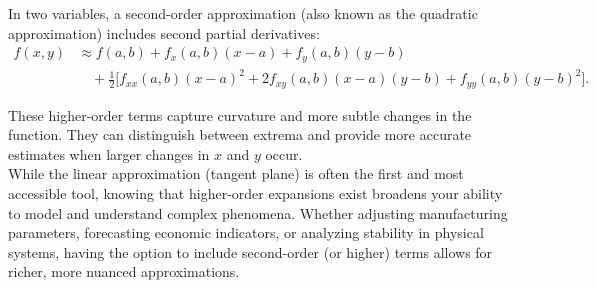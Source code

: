 \noindent In two variables, a second-order approximation (also known as the quadratic approximation) includes second partial derivatives:
\[
\begin{split}
f(x,y) &\approx f(a,b) + f_x(a,b)(x-a) + f_y(a,b)(y-b) \\
&\quad + \tfrac{1}{2}\bigl[f_{xx}(a,b)(x-a)^2 + 2f_{xy}(a,b)(x-a)(y-b) + f_{yy}(a,b)(y-b)^2\bigr].
\end{split}
\]

\noindent These higher-order terms capture curvature and more subtle changes in the function. They can distinguish between extrema and provide more accurate estimates when larger changes in \( x \) and \( y \) occur. \\

\noindent While the linear approximation (tangent plane) is often the first and most accessible tool, knowing that higher-order expansions exist broadens your ability to model and understand complex phenomena. Whether adjusting manufacturing parameters, forecasting economic indicators, or analyzing stability in physical systems, having the option to include second-order (or higher) terms allows for richer, more nuanced approximations.

